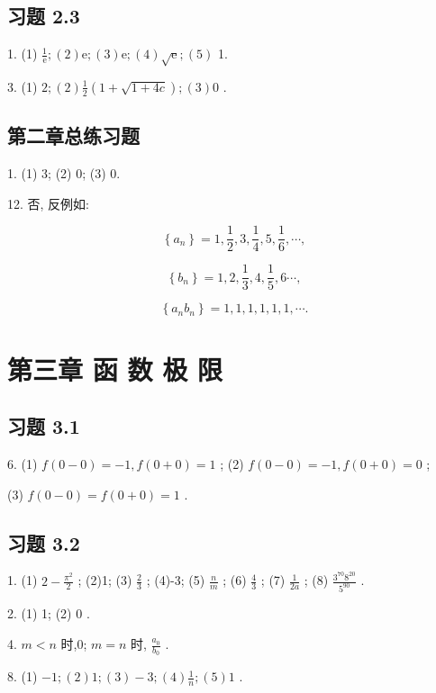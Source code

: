 \subsection{习题 2.3}

1. (1) \(\frac{1}{\mathrm{e}};\left( 2\right) \mathrm{e};\left( 3\right) \mathrm{e};\left( 4\right) \sqrt{\mathrm{e}};\left( 5\right)\) 1.

3. (1) \(2;\left( 2\right) \frac{1}{2}\left( {1 + \sqrt{1 + {4c}}}\right) ;\left( 3\right) 0\) .

\subsection{第二章总练习题}

1. (1) 3; (2) 0; (3) 0.

12. 否, 反例如:

\[
\left\{  {a}_{n}\right\}   = 1,\frac{1}{2},3,\frac{1}{4},5,\frac{1}{6},\cdots ,
\]

\[
\left\{  {b}_{n}\right\}   = 1,2,\frac{1}{3},4,\frac{1}{5},6\cdots ,
\]

\[
\left\{  {{a}_{n}{b}_{n}}\right\}   = 1,1,1,1,1,1,\cdots .
\]

\section{第三章 函 数 极 限}

\subsection{习题 3.1}

6. (1) \(f\left( {0 - 0}\right)  =  - 1,f\left( {0 + 0}\right)  = 1\) ; (2) \(f\left( {0 - 0}\right)  =  - 1,f\left( {0 + 0}\right)  = 0\) ;

(3) \(f\left( {0 - 0}\right)  = f\left( {0 + 0}\right)  = 1\) .

\subsection{习题 3.2}

1. (1) \(2 - \frac{{\pi }^{2}}{2}\) ; (2)1; (3) \(\frac{2}{3}\) ; (4)-3; (5) \(\frac{n}{m}\) ; (6) \(\frac{4}{3}\) ; (7) \(\frac{1}{2a}\) ; (8) \(\frac{{3}^{70}{8}^{20}}{{5}^{90}}\) .

2. (1) 1; (2) 0 .

4. \(m < n\) 时,0; \(m = n\) 时, \(\frac{{a}_{0}}{{b}_{0}}\) .

8. (1) \(- 1;\left( 2\right) 1;\left( 3\right)  - 3;\left( 4\right) \frac{1}{n};\left( 5\right) 1\) .

